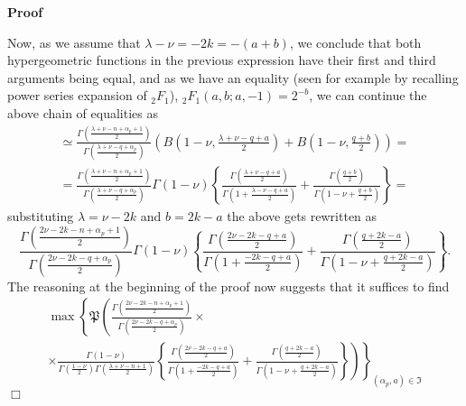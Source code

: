 \documentclass[12pt]{article}
\newcommand{\um}{-}
\renewenvironment{proof}{\noindent\textbf{Proof\ }}{\hspace*{\fill}$\Box$\medskip}
\theoremstyle{remark}
\begin{document}
\begin{proof}
  
  Now, as we assume that $\lambda - \nu = - 2 k = - (a + b)$, we conclude that
  both hypergeometric functions in the previous expression have their first
  and third arguments being equal, and as we have an equality (seen for
  example by recalling power series expansion of $_2 F_1$), $_2 F_1 (a, b ; a,
  - 1) = 2^{- b}$, we can continue the above chain of equalities as
  \begin{eqnarray}
    & \simeq \frac{\Gamma \left( \frac{\lambda + \nu - n + \alpha_p + 1}{2}
    \right)}{\Gamma \left( \frac{\lambda + \nu - q + \alpha_p}{2} \right)}
    \left( B \left( 1 \um \nu, \frac{\lambda + \nu - q + a}{2} \right) + B
    \left( 1 - \nu, \frac{q + b}{2} \right) \right) = &  \nonumber\\
    & = \frac{\Gamma \left( \frac{\lambda + \nu - n + \alpha_p + 1}{2}
    \right)}{\Gamma \left( \frac{\lambda + \nu - q + \alpha_p}{2} \right)}
    \Gamma (1 - \nu) \left\{ \frac{\Gamma \left( \frac{\lambda + \nu - q +
    a}{2} \right)}{\Gamma \left( 1 + \frac{\lambda - \nu - q + a}{2} \right)}
    + \frac{\Gamma \left( \frac{q + b}{2} \right)}{\Gamma \left( 1 - \nu +
    \frac{q + b}{2} \right)} \right\} = &  \nonumber
  \end{eqnarray}
  substituting $\lambda = \nu - 2 k$ and $b = 2 k - a$ the above gets
  rewritten as\quad
  \[ \frac{\Gamma \left( \frac{2 \nu - 2 k - n + \alpha_p + 1}{2}
     \right)}{\Gamma \left( \frac{2 \nu - 2 k - q + \alpha_p}{2} \right)}
     \Gamma (1 - \nu) \left\{ \frac{\Gamma \left( \frac{2 \nu - 2 k - q +
     a}{2} \right)}{\Gamma \left( 1 + \frac{- 2 k - q + a}{2} \right)} +
     \frac{\Gamma \left( \frac{q + 2 k - a}{2} \right)}{\Gamma \left( 1 - \nu
     + \frac{q + 2 k - a}{2} \right)} \right\} . \]
  The reasoning at the beginning of the proof now suggests that it suffices to
  find
  \begin{eqnarray}
    & \max \left\{ \mathfrak{P} \left( \frac{\Gamma \left( \frac{2 \nu - 2
    k - n + \alpha_p + 1}{2} \right)}{\Gamma \left( \frac{2 \nu - 2 k - q +
    \alpha_p}{2} \right)} \times \right. \right. &  \nonumber\\
    & \times \left. \left. \frac{\Gamma (1 - \nu)}{\Gamma \left( \frac{1 -
    \nu}{2} \right) \Gamma \left( \frac{\lambda + \nu - n + 1}{2} \right)}
    \left\{ \frac{\Gamma \left( \frac{2 \nu - 2 k - q + a}{2} \right)}{\Gamma
    \left( 1 + \frac{- 2 k - q + a}{2} \right)} + \frac{\Gamma \left( \frac{q
    + 2 k - a}{2} \right)}{\Gamma \left( 1 - \nu + \frac{q + 2 k - a}{2}
    \right)} \right\} \right) \right\}_{(\alpha_p, a) \in \mathfrak{I}} & 

\end{eqnarray}
\end{proof}
\end{document}
